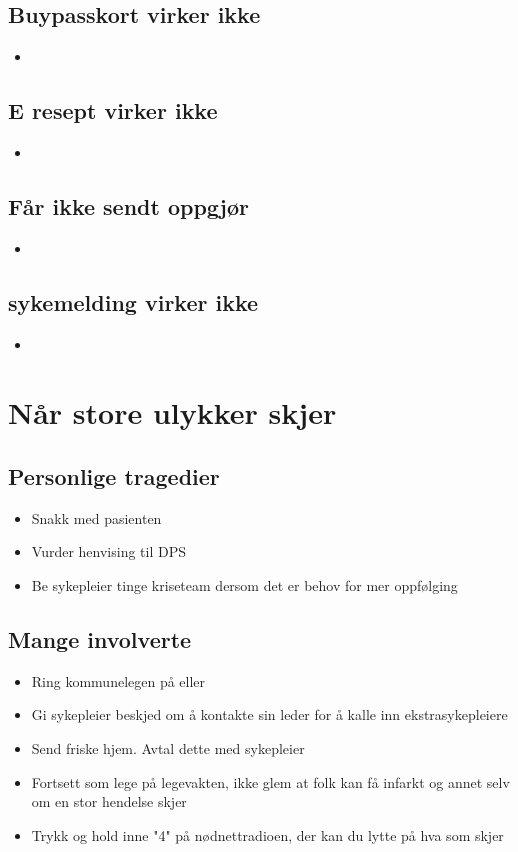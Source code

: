 	\section{Buypasskort virker ikke}
		\begin{itemize}
			\item
		\end{itemize}
	\section{E resept virker ikke}
		\begin{itemize}
			\item
		\end{itemize}
	\section{Får ikke sendt oppgjør}
		\begin{itemize}
			\item
		\end{itemize}
	\section{sykemelding virker ikke}%
		\begin{itemize}
			\item
		\end{itemize}

\newpage
\chapter{Når store ulykker skjer}
	\section{Personlige tragedier}
		\begin{itemize}
			\item Snakk med pasienten
			\item Vurder henvising til DPS
			\item Be sykepleier tinge kriseteam dersom det er behov for mer oppfølging
		\end{itemize}
	\section{Mange involverte}
		\begin{itemize}
			\item Ring kommunelegen på \pawmob{} eller \ebmob{}
			\item Gi sykepleier beskjed om å kontakte sin leder for å kalle inn ekstrasykepleiere
			\item Send friske hjem. Avtal dette med sykepleier
			\item Fortsett som lege på legevakten, ikke glem at folk kan få infarkt og annet selv om en stor hendelse skjer
			\item Trykk og hold inne "4" på nødnettradioen, der kan du lytte på hva som skjer
		\end{itemize}

